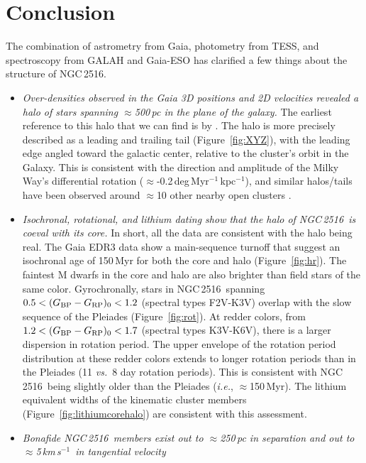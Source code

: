 \documentclass[12pt,twocolumn,tighten]{aastex63}
\newcommand{\cn}{NGC\,2516} %
\newcommand{\kms}{\,km\,s$^{-1}$}
\newcommand{\bpmrpo}{(G_{\rm BP}-G_{\rm RP})_0}
\begin{document}
\section{Conclusion}
\label{sec:conclusion}

The combination of astrometry from Gaia, photometry from TESS, and
spectroscopy from GALAH and Gaia-ESO has clarified a few things about
the structure of \cn.
\begin{itemize}
  \item {\it Over-densities observed in the Gaia 3D positions and 2D
    velocities revealed a halo of stars spanning $\approx$500\,pc
    in the plane of the galaxy.} The earliest reference to this halo
    that we can find is by \citet{kounkel_untangling_2019}.  The halo
    is more precisely described as a leading and trailing tail
    (Figure~\ref{fig:XYZ}), with the leading edge angled toward the
    galactic center, relative to the cluster's orbit in the Galaxy.
    This is consistent with the direction and amplitude of the Milky
    Way's differential rotation
    ($\approx$-0.2\,deg\,Myr$^{-1}$\,kpc$^{-1}$), and similar
    halos/tails have been observed around $\approx$10 other nearby
    open clusters \citep{meingast_2021}.
  \item {\it Isochronal, rotational, and lithium dating show that the
    halo of \cn\ is coeval with its core.} In short, all the data are
    consistent with the halo being real.  The Gaia EDR3 data
    show a main-sequence turnoff that suggest an isochronal
    age of 150\,Myr for both the core and halo (Figure~\ref{fig:hr}).
    The faintest M dwarfs in the core and halo are also brighter than
    field stars of the same color.  Gyrochronally, stars in
    \cn\ spanning $0.5<\bpmrpo<1.2$ (spectral types F2V-K3V) overlap
    with the slow sequence of the Pleiades (Figure~\ref{fig:rot}).  At
    redder colors, from $1.2<\bpmrpo<1.7$ (spectral types K3V-K6V), there is a larger
    dispersion in rotation period.  The upper envelope of the rotation
    period distribution at these redder colors extends to longer
    rotation periods than in the Pleiades (11 {\it vs.}\ 8 day
    rotation periods).  This is consistent with \cn\ being slightly
    older than the Pleiades ({\it i.e.}, $\approx$150\,Myr).  The
    lithium equivalent widths of the kinematic cluster members
    (Figure~\ref{fig:lithiumcorehalo}) are consistent with this
    assessment.
  \item {\it Bonafide \cn\ members exist out to $\approx$250\,pc in
    separation and out to $\approx$5\kms\ in tangential velocity
}
\end{itemize}
\end{document}
